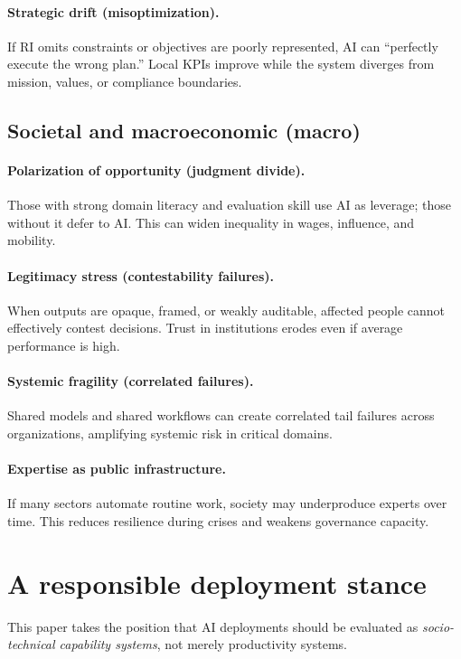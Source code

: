 \paragraph{Strategic drift (misoptimization).}
If RI omits constraints or objectives are poorly represented, AI can ``perfectly execute the wrong plan.'' Local KPIs improve while the system diverges from mission, values, or compliance boundaries.

\subsection{Societal and macroeconomic (macro)}
\paragraph{Polarization of opportunity (judgment divide).}
Those with strong domain literacy and evaluation skill use AI as leverage; those without it defer to AI. This can widen inequality in wages, influence, and mobility.

\paragraph{Legitimacy stress (contestability failures).}
When outputs are opaque, framed, or weakly auditable, affected people cannot effectively contest decisions. Trust in institutions erodes even if average performance is high.

\paragraph{Systemic fragility (correlated failures).}
Shared models and shared workflows can create correlated tail failures across organizations, amplifying systemic risk in critical domains.

\paragraph{Expertise as public infrastructure.}
If many sectors automate routine work, society may underproduce experts over time. This reduces resilience during crises and weakens governance capacity.

\section{A responsible deployment stance}
This paper takes the position that AI deployments should be evaluated as \emph{socio-technical capability systems}, not merely productivity systems.

